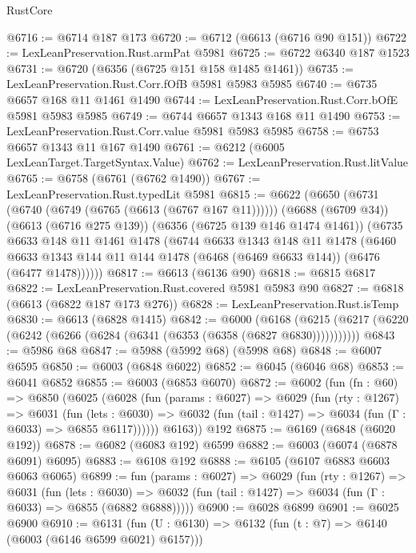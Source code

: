 \begin{lexlean}{RustCore}
\begin{coremodule}
{\begin{coremodule}
{{{{{{{{{{{{{{{{{{{{{{{{{{{{{{{{{{{{{{{{{{{{{{{@6716 := @6714 @187 @173
@6720 := @6712 (@6613 (@6716 @90 @151))
@6722 := LexLeanPreservation.Rust.armPat @5981
@6725 := @6722 @6340 @187 @1523
@6731 := @6720 (@6356 (@6725 @151 @158 @1485 @1461))
@6735 := LexLeanPreservation.Rust.Corr.fOfB @5981 @5983 @5985
@6740 := @6735 @6657 @168 @11 @1461 @1490
@6744 := LexLeanPreservation.Rust.Corr.bOfE @5981 @5983 @5985
@6749 := @6744 @6657 @1343 @168 @11 @1490
@6753 := LexLeanPreservation.Rust.Corr.value @5981 @5983 @5985
@6758 := @6753 @6657 @1343 @11 @167 @1490
@6761 := @6212 (@6005 LexLeanTarget.TargetSyntax.Value)
@6762 := LexLeanPreservation.Rust.litValue
@6765 := @6758 (@6761 (@6762 @1490))
@6767 := LexLeanPreservation.Rust.typedLit @5981
@6815 := @6622
    (@6650
      (@6731 (@6740 (@6749 (@6765 (@6613 (@6767 @167 @11))))))
      (@6688 (@6709 @34))
      (@6613 (@6716 @275 @139))
      (@6356 (@6725 @139 @146 @1474 @1461))
      (@6735
        @6633
        @148
        @11
        @1461
        @1478
        (@6744
          @6633
          @1343
          @148
          @11
          @1478
          (@6460
            @6633
            @1343
            @144
            @11
            @144
            @1478
            (@6468 (@6469 @6633 @144))
            (@6476 (@6477 @1478))))))
@6817 := @6613 (@6136 @90)
@6818 := @6815 @6817
@6822 := LexLeanPreservation.Rust.covered @5981 @5983 @90
@6827 := @6818 (@6613 (@6822 @187 @173 @276))
@6828 := LexLeanPreservation.Rust.isTemp
@6830 := @6613 (@6828 @1415)
@6842 := @6000
    (@6168 (@6215 (@6217 (@6220 (@6242 (@6266 (@6284 (@6341 (@6353 (@6358 (@6827 @6830)))))))))))
@6843 := @5986 @68
@6847 := @5988 (@5992 @68) (@5998 @68)
@6848 := @6007 @6595
@6850 := @6003 (@6848 @6022)
@6852 := @6045 (@6046 @68)
@6853 := @6041 @6852
@6855 := @6003 (@6853 @6070)
@6872 := @6002
    (fun (fn : @60) =>
    @6850
      (@6025
        (@6028
          (fun (params : @6027) =>
          @6029
            (fun (rty : @1267) =>
            @6031
              (fun (lets : @6030) =>
              @6032 (fun (tail : @1427) => @6034 (fun (Γ : @6033) => @6855 @6117))))))
        @6163))
    @192
@6875 := @6169 (@6848 (@6020 @192))
@6878 := @6082 (@6083 @192) @6599
@6882 := @6003 (@6074 (@6878 @6091) @6095)
@6883 := @6108 @192
@6888 := @6105 (@6107 @6883 @6603 @6063 @6065)
@6899 := fun (params : @6027) =>
  @6029
    (fun (rty : @1267) =>
    @6031
      (fun (lets : @6030) =>
      @6032 (fun (tail : @1427) => @6034 (fun (Γ : @6033) => @6855 (@6882 @6888)))))
@6900 := @6028 @6899
@6901 := @6025 @6900
@6910 := @6131 (fun (U : @6130) => @6132 (fun (t : @7) => @6140 (@6003 (@6146 @6599 @6021) @6157)))
}}}}}}}}}}}}}}}}}}}}}}}}}}}}}}}}}}}}}}}}}}}}}}}
\end{coremodule}}
\end{coremodule}
\end{lexlean}
